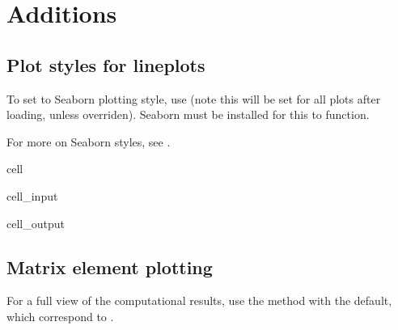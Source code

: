 \documentclass[letterpaper,10pt,english]{jupyterBook}
\begin{document}
\section{Additions}
\label{\detokenize{testChpt/ePSproc_class_demo_161020:additions}}

\subsection{Plot styles for line\sphinxhyphen{}plots}
\label{\detokenize{testChpt/ePSproc_class_demo_161020:plot-styles-for-line-plots}}
\sphinxAtStartPar
To set to Seaborn plotting style, use  (note this will be set for all plots after loading, unless overriden). Seaborn must be installed for this to function.

\sphinxAtStartPar
For more on Seaborn styles, see .

\begin{sphinxuseclass}{cell}\begin{sphinxVerbatimInput}

\begin{sphinxuseclass}{cell_input}
\begin{sphinxVerbatim}[commandchars=\\\{\}]
   

\end{sphinxVerbatim}

\end{sphinxuseclass}\end{sphinxVerbatimInput}
\begin{sphinxVerbatimOutput}

\begin{sphinxuseclass}{cell_output}
\noindent{}

\noindent{}

\end{sphinxuseclass}\end{sphinxVerbatimOutput}

\end{sphinxuseclass}

\subsection{Matrix element plotting}
\label{\detokenize{testChpt/ePSproc_class_demo_161020:matrix-element-plotting}}
\sphinxAtStartPar
For a full view of the computational results, use the  method with the default, which correspond to .
\end{document}
